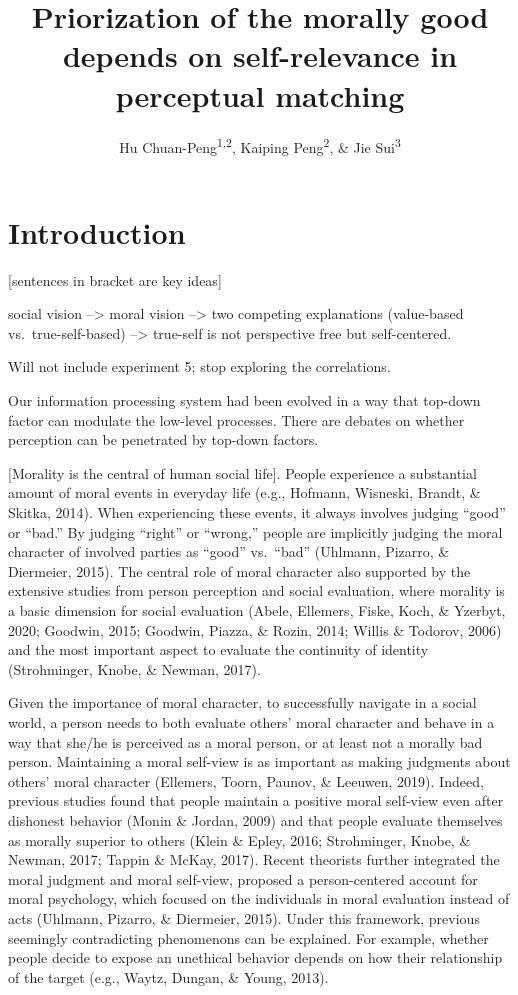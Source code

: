 \documentclass[
  english,
  man]{apa6}
\title{Priorization of the morally good depends on self-relevance in perceptual matching}
\author{Hu Chuan-Peng\textsuperscript{1,2}, Kaiping Peng\textsuperscript{2}, \& Jie Sui\textsuperscript{3}}
\date{}
\affiliation{\vspace{0.5cm}\textsuperscript{1} Nanjing Normal University, 210024 Nanjing, China\\\textsuperscript{2} Tsinghua University, 100084 Beijing, China\\\textsuperscript{3} University of Aberdeen, Aberdeen, Scotland}
\begin{document}
\maketitle

\hypertarget{introduction}{%
\section{Introduction}\label{introduction}}

{[}sentences in bracket are key ideas{]}

social vision --\textgreater{} moral vision --\textgreater{} two competing explanations (value-based vs.~true-self-based) --\textgreater{} true-self is not perspective free but self-centered.

Will not include experiment 5; stop exploring the correlations.

Our information processing system had been evolved in a way that top-down factor can modulate the low-level processes. There are debates on whether perception can be penetrated by top-down factors.

{[}Morality is the central of human social life{]}. People experience a substantial amount of moral events in everyday life (e.g., Hofmann, Wisneski, Brandt, \& Skitka, 2014). When experiencing these events, it always involves judging ``good'' or ``bad.'' By judging ``right'' or ``wrong,'' people are implicitly judging the moral character of involved parties as ``good'' vs.~``bad'' (Uhlmann, Pizarro, \& Diermeier, 2015). The central role of moral character also supported by the extensive studies from person perception and social evaluation, where morality is a basic dimension for social evaluation (Abele, Ellemers, Fiske, Koch, \& Yzerbyt, 2020; Goodwin, 2015; Goodwin, Piazza, \& Rozin, 2014; Willis \& Todorov, 2006) and the most important aspect to evaluate the continuity of identity (Strohminger, Knobe, \& Newman, 2017).

Given the importance of moral character, to successfully navigate in a social world, a person needs to both evaluate others' moral character and behave in a way that she/he is perceived as a moral person, or at least not a morally bad person. Maintaining a moral self-view is as important as making judgments about others' moral character (Ellemers, Toorn, Paunov, \& Leeuwen, 2019). Indeed, previous studies found that people maintain a positive moral self-view even after dishonest behavior (Monin \& Jordan, 2009) and that people evaluate themselves as morally superior to others (Klein \& Epley, 2016; Strohminger, Knobe, \& Newman, 2017; Tappin \& McKay, 2017). Recent theorists further integrated the moral judgment and moral self-view, proposed a person-centered account for moral psychology, which focused on the individuals in moral evaluation instead of acts (Uhlmann, Pizarro, \& Diermeier, 2015). Under this framework, previous seemingly contradicting phenomenons can be explained. For example, whether people decide to expose an unethical behavior depends on how their relationship of the target (e.g., Waytz, Dungan, \& Young, 2013).
\end{document}
